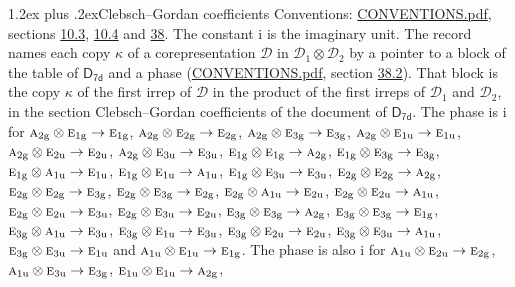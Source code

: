 \documentclass[10pt,a4paper]{article}
\makeatletter
\renewcommand\section{\@startsection{section}{1}{\z@}{-3ex plus -1ex minus -.2ex}%
  {1.2ex plus .2ex}{\normalfont\large\sffamily\bfseries\color{parttitle}}}
\numberwithin{equation}{section}
\newcommand{\grp}[1]{\mathsf{#1}}
\newcommand{\irr}[1]{\text{\normalfont\scshape #1}}
\newcommand{\ptag}[1]{\mathrm{#1}}
\newcommand{\iunit}{\mathrm{i}}
\newcommand{\irrprod}{\otimes}
\newcommand{\mult}{\kappa}
\makeatother
\begin{document}
\section{Clebsch--Gordan coefficients}\label{s:clebsch_gordan}
Conventions: \href{../../CONVENTIONS.pdf}{CONVENTIONS.pdf}, sections \href{../../../rotation/CONVENTIONS.pdf\#conv.10.3}{10.3}, \href{../../../rotation/CONVENTIONS.pdf\#conv.10.4}{10.4} and \href{../../CONVENTIONS.pdf\#conv.38}{38}.
The constant $\iunit$ is the imaginary unit.
\leavevmode\label{n:index.copy}The record names each copy $\mult$ of a corepresentation $\mathcal{D}$ in $\mathcal{D}_1\irrprod\mathcal{D}_2$ by a pointer to a block of the table of $\grp{D_{7d}}$ and a phase (\href{../../CONVENTIONS.pdf}{CONVENTIONS.pdf}, section \href{../../CONVENTIONS.pdf\#conv.38.2}{38.2}). That block is the copy $\mult$ of the first irrep of $\mathcal{D}$ in the product of the first irreps of $\mathcal{D}_1$ and $\mathcal{D}_2$, in the section Clebsch--Gordan coefficients of the document of \href{../../../rotation/data/pdf/D7d.pdf}{$\grp{D_{7d}}$}. The phase is $\iunit$ for $\irr{a}_{2\ptag{g}}\irrprod \irr{e}_{1\ptag{g}}\to \irr{e}_{1\ptag{g}}$, $\irr{a}_{2\ptag{g}}\irrprod \irr{e}_{2\ptag{g}}\to \irr{e}_{2\ptag{g}}$, $\irr{a}_{2\ptag{g}}\irrprod \irr{e}_{3\ptag{g}}\to \irr{e}_{3\ptag{g}}$, $\irr{a}_{2\ptag{g}}\irrprod \irr{e}_{1\ptag{u}}\to \irr{e}_{1\ptag{u}}$, $\irr{a}_{2\ptag{g}}\irrprod \irr{e}_{2\ptag{u}}\to \irr{e}_{2\ptag{u}}$, $\irr{a}_{2\ptag{g}}\irrprod \irr{e}_{3\ptag{u}}\to \irr{e}_{3\ptag{u}}$, $\irr{e}_{1\ptag{g}}\irrprod \irr{e}_{1\ptag{g}}\to \irr{a}_{2\ptag{g}}$, $\irr{e}_{1\ptag{g}}\irrprod \irr{e}_{3\ptag{g}}\to \irr{e}_{3\ptag{g}}$, $\irr{e}_{1\ptag{g}}\irrprod \irr{a}_{1\ptag{u}}\to \irr{e}_{1\ptag{u}}$, $\irr{e}_{1\ptag{g}}\irrprod \irr{e}_{1\ptag{u}}\to \irr{a}_{1\ptag{u}}$, $\irr{e}_{1\ptag{g}}\irrprod \irr{e}_{3\ptag{u}}\to \irr{e}_{3\ptag{u}}$, $\irr{e}_{2\ptag{g}}\irrprod \irr{e}_{2\ptag{g}}\to \irr{a}_{2\ptag{g}}$, $\irr{e}_{2\ptag{g}}\irrprod \irr{e}_{2\ptag{g}}\to \irr{e}_{3\ptag{g}}$, $\irr{e}_{2\ptag{g}}\irrprod \irr{e}_{3\ptag{g}}\to \irr{e}_{2\ptag{g}}$, $\irr{e}_{2\ptag{g}}\irrprod \irr{a}_{1\ptag{u}}\to \irr{e}_{2\ptag{u}}$, $\irr{e}_{2\ptag{g}}\irrprod \irr{e}_{2\ptag{u}}\to \irr{a}_{1\ptag{u}}$, $\irr{e}_{2\ptag{g}}\irrprod \irr{e}_{2\ptag{u}}\to \irr{e}_{3\ptag{u}}$, $\irr{e}_{2\ptag{g}}\irrprod \irr{e}_{3\ptag{u}}\to \irr{e}_{2\ptag{u}}$, $\irr{e}_{3\ptag{g}}\irrprod \irr{e}_{3\ptag{g}}\to \irr{a}_{2\ptag{g}}$, $\irr{e}_{3\ptag{g}}\irrprod \irr{e}_{3\ptag{g}}\to \irr{e}_{1\ptag{g}}$, $\irr{e}_{3\ptag{g}}\irrprod \irr{a}_{1\ptag{u}}\to \irr{e}_{3\ptag{u}}$, $\irr{e}_{3\ptag{g}}\irrprod \irr{e}_{1\ptag{u}}\to \irr{e}_{3\ptag{u}}$, $\irr{e}_{3\ptag{g}}\irrprod \irr{e}_{2\ptag{u}}\to \irr{e}_{2\ptag{u}}$, $\irr{e}_{3\ptag{g}}\irrprod \irr{e}_{3\ptag{u}}\to \irr{a}_{1\ptag{u}}$, $\irr{e}_{3\ptag{g}}\irrprod \irr{e}_{3\ptag{u}}\to \irr{e}_{1\ptag{u}}$ and $\irr{a}_{1\ptag{u}}\irrprod \irr{e}_{1\ptag{u}}\to \irr{e}_{1\ptag{g}}$. The phase is also $\iunit$ for $\irr{a}_{1\ptag{u}}\irrprod \irr{e}_{2\ptag{u}}\to \irr{e}_{2\ptag{g}}$, $\irr{a}_{1\ptag{u}}\irrprod \irr{e}_{3\ptag{u}}\to \irr{e}_{3\ptag{g}}$, $\irr{e}_{1\ptag{u}}\irrprod \irr{e}_{1\ptag{u}}\to \irr{a}_{2\ptag{g}}$, 
\end{document}
